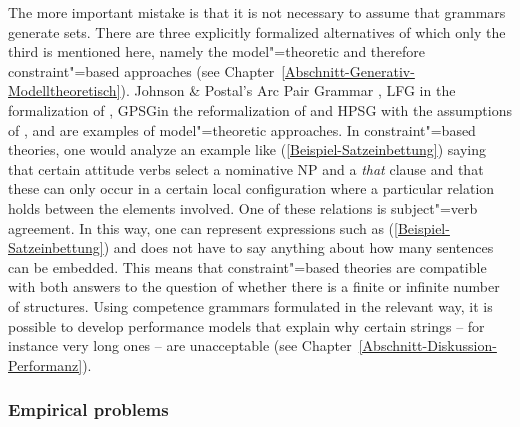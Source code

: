 The more important mistake is that it is not necessary to assume that grammars generate
sets. There are three explicitly formalized alternatives of which only the third is mentioned here,
namely the model"=theoretic and therefore constraint"=based approaches (see 
Chapter~\ref{Abschnitt-Generativ-Modelltheoretisch}). Johnson \& Postal's Arc Pair Grammar \citeyearpar{JP80a-u}, LFG\indexlfg
in the formalization of \citet{Kaplan95a}, GPSG\indexgpsg in the reformalization of \citet{Rogers97a} and HPSG\indexhpsg
with the assumptions of \citet{King99a-u}, \citet{Pollard99a} and \citet{Richter2007a} are examples of model"=theoretic approaches.
In constraint"=based theories, one would analyze an example like (\ref{Beispiel-Satzeinbettung}) saying that certain attitude verbs select a nominative NP and a 
\emph{that} clause and that these can only occur in a certain local configuration where a particular relation holds between the elements involved.
One of these relations is subject"=verb agreement. In this way, one can represent expressions such as (\ref{Beispiel-Satzeinbettung})
and does not have to say anything about how many sentences can be embedded.
This means that constraint"=based theories are compatible with both answers to the question of whether there is a finite or infinite number of structures.
Using competence grammars formulated in the relevant way, it is possible to develop performance
models that explain why certain strings -- for instance very long ones -- are unacceptable
(see Chapter~\ref{Abschnitt-Diskussion-Performanz}).

\subsubsection{Empirical problems}


